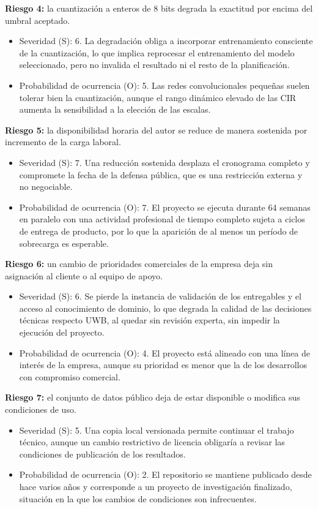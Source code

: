 \documentclass[
11pt, %
]{charter}
\begin{document}
\textbf{Riesgo 4:} la cuantización a enteros de 8 bits degrada la exactitud por encima del umbral aceptado.
\begin{itemize}
    \item Severidad (S): 6. La degradación obliga a incorporar entrenamiento consciente de la cuantización, lo que implica reprocesar el entrenamiento del modelo seleccionado, pero no invalida el resultado ni el resto de la planificación.
    \item Probabilidad de ocurrencia (O): 5. Las redes convolucionales pequeñas suelen tolerar bien la cuantización, aunque el rango dinámico elevado de las CIR aumenta la sensibilidad a la elección de las escalas.
\end{itemize}

\textbf{Riesgo 5:} la disponibilidad horaria del autor se reduce de manera sostenida por incremento de la carga laboral.
\begin{itemize}
    \item Severidad (S): 7. Una reducción sostenida desplaza el cronograma completo y compromete la fecha de la defensa pública, que es una restricción externa y no negociable.
    \item Probabilidad de ocurrencia (O): 7. El proyecto se ejecuta durante 64 semanas en paralelo con una actividad profesional de tiempo completo sujeta a ciclos de entrega de producto, por lo que la aparición de al menos un período de sobrecarga es esperable.
\end{itemize}

\textbf{Riesgo 6:} un cambio de prioridades comerciales de la empresa deja sin asignación al cliente o al equipo de apoyo.
\begin{itemize}
    \item Severidad (S): 6. Se pierde la instancia de validación de los entregables y el acceso al conocimiento de dominio, lo que degrada la calidad de las decisiones técnicas respecto UWB, al quedar sin revisión experta, sin impedir la ejecución del proyecto.
    \item Probabilidad de ocurrencia (O): 4. El proyecto está alineado con una línea de interés de la empresa, aunque su prioridad es menor que la de los desarrollos con compromiso comercial.
\end{itemize}

\textbf{Riesgo 7:} el conjunto de datos público deja de estar disponible o modifica sus condiciones de uso.
\begin{itemize}
    \item Severidad (S): 5. Una copia local versionada permite continuar el trabajo técnico, aunque un cambio restrictivo de licencia obligaría a revisar las condiciones de publicación de los resultados.
    \item Probabilidad de ocurrencia (O): 2. El repositorio se mantiene publicado desde hace varios años y corresponde a un proyecto de investigación finalizado, situación en la que los cambios de condiciones son infrecuentes.
\end{itemize}
\end{document}
